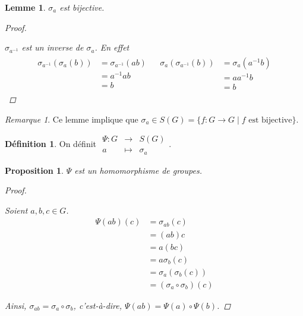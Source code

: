 \documentclass{report}
\newtheorem*{lem}{Lemme}
\newtheorem*{prop}{Proposition}
\theoremstyle{definition}
\newtheorem*{defin}{D\'efinition}
\theoremstyle{remark}
\newtheorem*{rema}{Remarque}
\begin{document}
	\begin{lem}
		$\sigma_a$ est bijective.
		\begin{proof}~

			$\sigma_{a^{-1}}$ est un inverse de $\sigma_a$. En effet
			\begin{align*}
				\begin{split}
					\sigma_{a^{-1}}(\sigma_a(b))&= \sigma_{a^{-1}}(ab)\\
					&= a^{-1}ab\\
					&= b
				\end{split}
				&
				\begin{split}
					\sigma_a(\sigma_{a^{-1}}(b))&= \sigma_a(a^{-1}b)\\
					&= aa^{-1}b\\
					&= b
				\end{split}
			\end{align*}
		\end{proof}
	\end{lem}
	\begin{rema}
		Ce lemme implique que $\sigma_a \in S(G) = \{f:G \to G \mid f \text{ est bijective}\}$.
	\end{rema}
	\begin{defin}
		On d\'efinit $\begin{array}{rcl}
			\Psi:G&\to&S(G)\\
			a&\mapsto&\sigma_a
		\end{array}$.
	\end{defin}
	\begin{prop}
		$\Psi$ est un homomorphisme de groupes.
		\begin{proof}~

			Soient $a,b,c \in G$.
			\begin{align*}
				\Psi(ab)(c)&= \sigma_{ab}(c)\\
				&= (ab)c\\
				&= a(bc)\\
				&= a\sigma_b(c)\\
				&= \sigma_a(\sigma_b(c))\\
				&= (\sigma_a \circ \sigma_b)(c)
			\end{align*}

			Ainsi, $\sigma_{ab} = \sigma_a \circ \sigma_b$, c'est-\`a-dire, $\Psi(ab) = \Psi(a) \circ \Psi(b)$.
		\end{proof}
	\end{prop}
\end{document}
